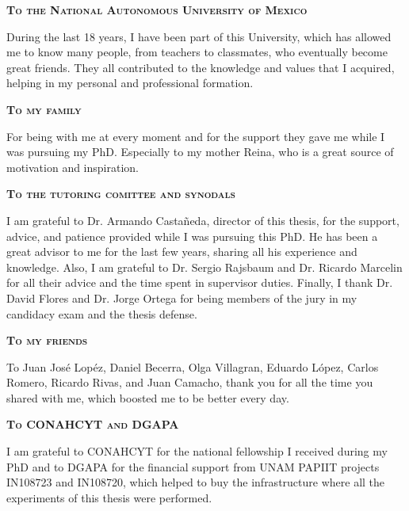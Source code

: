 {


\begin{agradecimientos}
  \textbf{\textsc{To the National Autonomous University of Mexico}}

  During the last 18 years, I have been part of this University, which has allowed me to know many people, from teachers to classmates, who eventually become great friends. They all contributed to the knowledge and values that I acquired, helping in my personal and professional formation.

  \textbf{\textsc{To my family}}

  For being with me at every moment and for the support they gave me while I was pursuing my PhD. Especially to my mother Reina, who is a great source of motivation and inspiration.

  \textbf{\textsc{To the tutoring comittee and synodals}}

  I am grateful to Dr. Armando Castañeda, director of this thesis, for the support, advice, and patience provided while I was pursuing this PhD. He has been a great advisor to me for the last few years, sharing all his experience and knowledge. Also, I am grateful to Dr. Sergio Rajsbaum and Dr. Ricardo Marcelin for all their advice and the time spent in supervisor duties. Finally, I thank Dr. David Flores and Dr. Jorge Ortega for being members of the jury in my candidacy exam and the thesis defense.

  \textbf{\textsc{To my friends}}

  To Juan José Lopéz, Daniel Becerra, Olga Villagran, Eduardo López, Carlos Romero, Ricardo Rivas, and Juan Camacho, thank you for all the time you shared with me, which boosted me to be better every day.

  \textbf{\textsc{To CONAHCYT and DGAPA}}

  I am grateful to CONAHCYT for the national fellowship I received during my PhD and to DGAPA for the financial support from UNAM PAPIIT projects IN108723 and IN108720, which helped to buy the infrastructure where all the experiments of this thesis were performed.

\end{agradecimientos}
}
